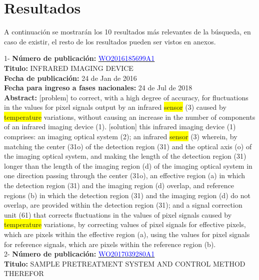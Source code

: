 \chapter{Resultados}
 A continuación se mostrarán los 10 resultados más 
    relevantes de la búsqueda, en caso de existir, el resto de los resultados pueden ser vistos en anexos.
 
 \vspace{1cm}1- \textbf{Número de publicación:} \href{https://worldwide.espacenet.com/publicationDetails/biblio?DB=EPODOC&II=0&ND=3&adjacent=true&locale=en_EP&FT=D&date=20160331&CC=WO&NR=2016185699A1&KC=A1#}{\textcolor{blue}{WO2016185699A1}}\\ 
\textbf{Titulo:} INFRARED IMAGING DEVICE\\ 
 
\textbf{Fecha de publicación:} 24 de Jan de 2016\\ 
\textbf{Fecha para ingreso a fases nacionales:} 24 de Jul de 2018\\ 
\textbf{Abstract:} [problem] to correct, with a high degree of accuracy, for fluctuations in the values for pixel signals output by an infrared \colorbox{yellow}{sensor} (3) caused by \colorbox{yellow}{temperature} variations, without causing an increase in the number of components of an infrared imaging device (1). [solution] this infrared imaging device (1) comprises: an imaging optical system (2); an infrared \colorbox{yellow}{sensor} (3) wherein, by matching the center (31o) of the detection region (31) and the optical axis (o) of the imaging optical system, and making the length of the detection region (31) longer than the length of the imaging region (d) of the imaging optical system in one direction passing through the center (31o), an effective region (a) in which the detection region (31) and the imaging region (d) overlap, and reference regions (b) in which the detection region (31) and the imaging region (d) do not overlap, are provided within the detection region (31); and a signal correction unit (61) that corrects fluctuations in the values of pixel signals caused by \colorbox{yellow}{temperature} variations, by correcting values of pixel signals for effective pixels, which are pixels within the effective region (a), using the values for pixel signals for reference signals, which are pixels within the reference region (b).\\ 
 

 \vspace{1cm}2- \textbf{Número de publicación:} \href{https://worldwide.espacenet.com/publicationDetails/biblio?DB=EPODOC&II=0&ND=3&adjacent=true&locale=en_EP&FT=D&date=20160331&CC=WO&NR=2017039280A1&KC=A1#}{\textcolor{blue}{WO2017039280A1}}\\ 
\textbf{Titulo:} SAMPLE PRETREATMENT SYSTEM AND CONTROL METHOD THEREFOR\\ 
 
